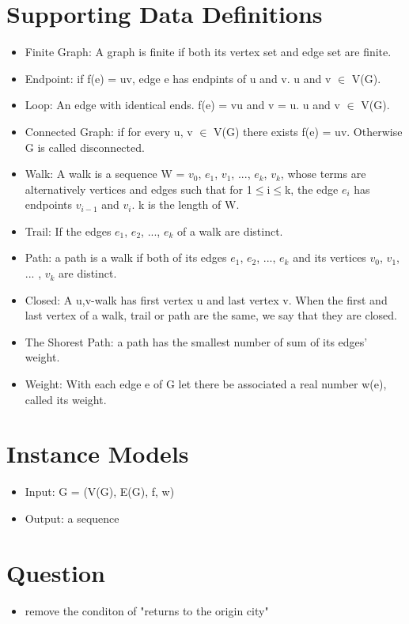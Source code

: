 \documentclass[12pt]{article}
\begin{document}
\section{Supporting Data Definitions}
\begin{itemize}
    \item Finite Graph: A graph is finite if both its vertex set and edge set are finite.
    \item Endpoint: if f(e) = uv, edge e has endpints of u and v. u and v $\in$  V(G).
    \item Loop: An edge with identical ends. f(e) = vu and v = u. u and v $\in$  V(G).
    \item Connected Graph: if for every u, v $\in$  V(G) there exists f(e) = uv. Otherwise G is called disconnected.
    \item Walk: A walk is a sequence W = {$v_0$, $e_1$, $v_1$, $...$, $e_k$, $v_k$}, whose terms are alternatively vertices 
    and edges such that for 1$\le$i$\le$k, the edge $e_i$ has endpoints $v_{i-1}$ and $v_i$. k is the length of W.
    \item Trail: If the edges $e_1$, $e_2$, $...$, $e_k$ of a walk are distinct.
    \item Path: a path is a walk if both of its edges $e_1$, $e_2$, $...$, $e_k$ and its vertices $v_0$, $v_1$, $...$ , $v_k$ are distinct.
    \item Closed: A u,v-walk has first vertex u and last vertex v. 
    When the first and last vertex of a walk, trail or path are the same, we say that they are closed. 
    \item The Shorest Path: a path has the smallest number of sum of its edges' weight.
    \item Weight: With each edge e of G let there be associated a real number w(e), called its weight.
\end{itemize}

\section{Instance Models}
\begin{itemize}
    \item Input: G = (V(G), E(G), f, w)
    \item Output: a sequence
\end{itemize}

\section{Question}
\begin{itemize}
    \item remove the conditon of "returns to the origin city"
\end{itemize}
\end{document}
